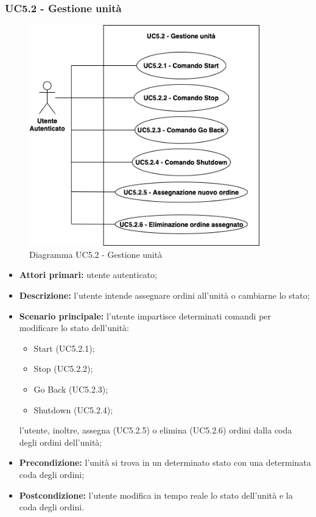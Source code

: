     \subsubsection{UC5.2 - Gestione unità}
    \begin{figure}[h!]
        \centering
        \includegraphics[width=10cm]{images/uc5.2.png}
        \caption{Diagramma UC5.2 - Gestione unità}
    \end{figure}
    \begin{itemize}
        \item \textbf{Attori primari:} utente autenticato;
        \item \textbf{Descrizione:} l'utente intende assegnare ordini all'unità o cambiarne lo stato;
        \item \textbf{Scenario principale:} l'utente impartisce determinati comandi per modificare lo stato dell'unità:
        \begin{itemize}
            \item Start (UC5.2.1);
            \item Stop (UC5.2.2);
            \item Go Back (UC5.2.3);
            \item Shutdown (UC5.2.4);
        \end{itemize}
        l'utente, inoltre, assegna (UC5.2.5) o elimina (UC5.2.6) ordini dalla coda degli ordini dell'unità;
        \item \textbf{Precondizione:} l'unità si trova in un determinato stato con una determinata coda degli ordini;
        \item \textbf{Postcondizione:} l'utente modifica in tempo reale lo stato dell'unità e la coda degli ordini.
    \end{itemize}

